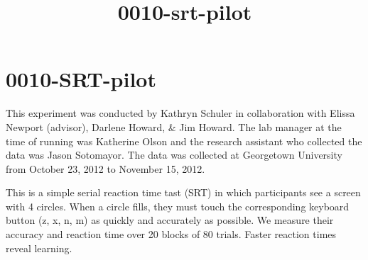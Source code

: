\documentclass[11pt]{article}
\title{0010-srt-pilot}
\begin{document}
    
    
    \maketitle
    
    

    
    \section{0010-SRT-pilot}\label{srt-pilot}

This experiment was conducted by Kathryn Schuler in collaboration with
Elissa Newport (advisor), Darlene Howard, \& Jim Howard. The lab manager
at the time of running was Katherine Olson and the research assistant
who collected the data was Jason Sotomayor. The data was collected at
Georgetown University from October 23, 2012 to November 15, 2012.

This is a simple serial reaction time tast (SRT) in which participants
see a screen with 4 circles. When a circle fills, they must touch the
corresponding keyboard button (z, x, n, m) as quickly and accurately as
possible. We measure their accuracy and reaction time over 20 blocks of
80 trials. Faster reaction times reveal learning.
\end{document}
